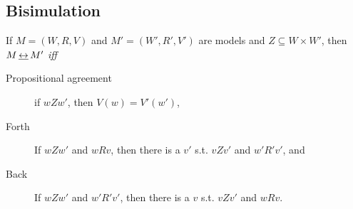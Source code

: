 \subsection{Bisimulation}
\begin{definition} If $M = (W, R, V)$ and $M' = (W', R', V')$ are models and $Z \subseteq W \times W'$, then $M \,\underline{\leftrightarrow}\, M'$ \textit{iff}
\begin{description}
\item[Propositional agreement] if $wZw'$, then $V(w) = V'(w')$, 
\item[Forth] If $wZw'$ and $wRv$, then there is a $v'$ s.t. $vZv'$ and $w'R'v'$, and
\item[Back] If $wZw'$ and $w'R'v'$, then there is a $v$ s.t. $vZv'$ and $wRv$.
\end{description}
\end{definition}

